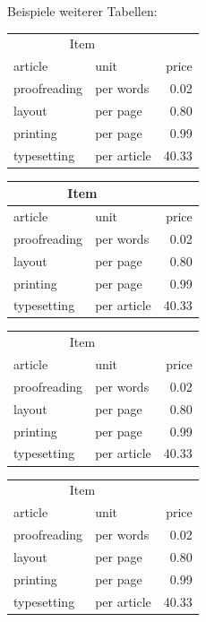 \begin{frame}[fragile]

\footnotesize{
Beispiele weiterer Tabellen:

\begin{multicols}{2}

\begin{tabular}[t]{llr}
\multicolumn{2}{c}{Item} &  \\
article & unit & price \\
proofreading & per words & 0.02 \\
layout & per page & 0.80 \\
printing & per page & 0.99 \\
typesetting & per article & 40.33 \\
\end{tabular}

\vspace{\baselineskip}

\begin{tabular}[t]{|l|l|r|}
\hline
\multicolumn{2}{|c}{Item} &  \\
\hline
article & unit & price \\
\hline
proofreading & per words & 0.02 \\
\hline
layout & per page & 0.80 \\
\hline
printing & per page & 0.99 \\
\hline
typesetting & per article & 40.33 \\
\hline
\end{tabular}

\vspace{\baselineskip}

\columnbreak{}

\begin{tabular}[t]{llr}
\hline
\multicolumn{2}{c}{Item} &  \\
\cline{1-2}
article & unit & price \\
\hline
proofreading & per words & 0.02 \\
layout & per page & 0.80 \\
printing & per page & 0.99 \\
typesetting & per article & 40.33 \\
\hline
\end{tabular}

\vspace{\baselineskip}

\begin{tabular}[t]{llr}
\toprule
\multicolumn{2}{c}{Item} &  \\
\cmidrule{1-2}
article & unit & price \\
\midrule
proofreading & per words & 0.02 \\
layout & per page & 0.80 \\
printing & per page & 0.99 \\
typesetting & per article & 40.33 \\
\bottomrule
\end{tabular}

\end{multicols}
}
\end{frame}



